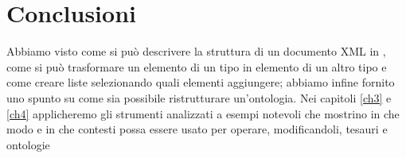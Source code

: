 \section{Conclusioni}
Abbiamo visto come si può descrivere la struttura di un documento XML in \cduce, come si può trasformare un elemento di un tipo in elemento di un altro tipo e come creare liste selezionando quali elementi aggiungere; abbiamo infine fornito uno spunto su come sia possibile ristrutturare un'ontologia. Nei capitoli \ref{ch3} e \ref{ch4} applicheremo gli strumenti analizzati a esempi notevoli che mostrino in che modo e in che contesti \cduce possa essere usato per operare, modificandoli, tesauri e ontologie